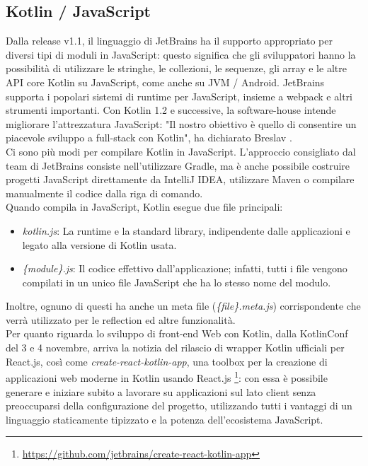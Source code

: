 \subsection{Kotlin / JavaScript}
Dalla release v1.1, il linguaggio di JetBrains ha il supporto appropriato per diversi tipi di moduli in JavaScript: questo significa che gli sviluppatori hanno la possibilità di utilizzare le stringhe, le collezioni, le sequenze, gli array e le altre API core Kotlin su JavaScript, come anche su JVM / Android. JetBrains supporta i popolari sistemi di runtime per JavaScript, insieme a webpack e altri strumenti importanti. Con Kotlin 1.2 e successive, la software-house intende migliorare l'attrezzatura JavaScript: "Il nostro obiettivo è quello di consentire un piacevole sviluppo a full-stack con Kotlin", ha dichiarato Breslav \cite{andreyBreslavInterview}.\\
Ci sono più modi per compilare Kotlin in JavaScript. L'approccio consigliato dal team di JetBrains consiste nell'utilizzare Gradle, ma è anche possibile costruire progetti JavaScript direttamente da IntelliJ IDEA, utilizzare Maven o compilare manualmente il codice dalla riga di comando.\\
Quando compila in JavaScript, Kotlin esegue due file principali:
\begin{itemize}
  \item {\em kotlin.js}: La runtime e la standard library, indipendente dalle applicazioni e legato alla versione di Kotlin   usata.
  \item {\em \{module\}.js}: Il codice effettivo dall'applicazione; infatti, tutti i file vengono compilati in un unico file JavaScript che ha lo stesso nome del modulo.
\end{itemize}
Inoltre, ognuno di questi ha anche un meta file ({\em \{file\}.meta.js}) corrispondente che verrà utilizzato per le reflection ed altre funzionalità.\\
Per quanto riguarda lo sviluppo di front-end Web con Kotlin, dalla KotlinConf del 3 e 4 novembre, arriva la notizia del rilascio di wrapper Kotlin ufficiali per React.js, così come {\em create-react-kotlin-app}, una toolbox per la creazione di applicazioni web moderne in Kotlin usando React.js \footnote{\url{https://github.com/jetbrains/create-react-kotlin-app}}: con essa è possibile generare e iniziare subito a lavorare su applicazioni sul lato client senza preoccuparsi della configurazione del progetto, utilizzando tutti i vantaggi di un linguaggio staticamente tipizzato e la potenza dell'ecosistema JavaScript.\\


